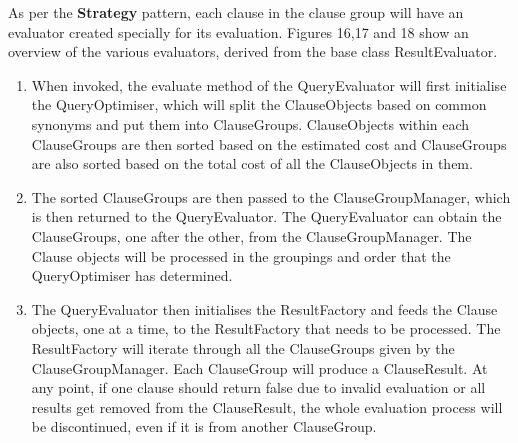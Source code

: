 \documentclass[12pt]{article}
\begin{document}
{{{{{{{{{{{{{As per the \textbf{Strategy} pattern, each clause in the clause group will have an evaluator created specially for its evaluation. Figures 16,17 and 18 show an overview of the various evaluators, derived from the base class ResultEvaluator. 
\begin{enumerate}
\item When invoked, the evaluate method of the QueryEvaluator will first initialise the QueryOptimiser, which will split the ClauseObjects based on common synonyms and put them into ClauseGroups. ClauseObjects within each ClauseGroups are then sorted based on the estimated cost and ClauseGroups are also sorted based on the total cost of all the ClauseObjects in them.
\item The sorted ClauseGroups are then passed to the ClauseGroupManager, which is then returned to the QueryEvaluator. The QueryEvaluator can obtain the ClauseGroups, one after the other, from the ClauseGroupManager. The Clause objects will be processed in the groupings and order that the QueryOptimiser has determined.

\item The QueryEvaluator then initialises the ResultFactory and feeds the Clause objects, one at a time, to the ResultFactory that needs to be processed. The ResultFactory will iterate through all the ClauseGroups given by the ClauseGroupManager. Each ClauseGroup will produce a ClauseResult. At any point, if one clause should return false due to invalid evaluation or all results get removed from the ClauseResult, the whole evaluation process will be discontinued, even if it is from another ClauseGroup.


\end{enumerate}}}}}}}}}}}}}}
\end{document}
